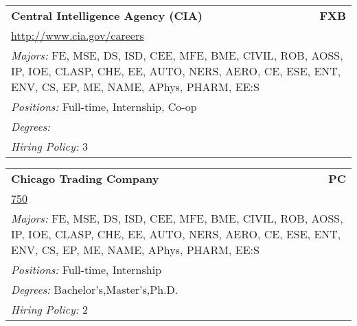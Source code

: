 \documentclass[twoside]{article}
\begin{document}
\begin{center}
\begin{multicols}{3}
\begin{FlushLeft}
\begin{minipage}{\columnwidth}\begin{tabularx}{.95\columnwidth}{Xr}
                 {\Large\bf Central Intelligence Agency (CIA)} & {\Large\bf FXB}\\
    \multicolumn{2}{p{.95\columnwidth}}{\url{http://www.cia.gov/careers}}\\
    \multicolumn{2}{p{.95\columnwidth}}{\emph{Majors:} FE, MSE, DS, ISD, CEE, MFE, BME, CIVIL, ROB, AOSS, IP, IOE, CLASP, CHE, EE, AUTO, NERS, AERO, CE, ESE, ENT, ENV, CS, EP, ME, NAME, APhys, PHARM, EE:S}\\
    \multicolumn{2}{p{.95\columnwidth}}{\emph{Positions:} Full-time, Internship, Co-op}\\
    \multicolumn{2}{p{.95\columnwidth}}{\emph{Degrees:} }\\
    \multicolumn{2}{p{.95\columnwidth}}{\emph{Hiring Policy:} 3}\\
    \end{tabularx}
    
\end{minipage}
 
\begin{minipage}{\columnwidth}\begin{tabularx}{.95\columnwidth}{Xr}
                 {\Large\bf Chicago Trading Company} & {\Large\bf PC}\\
    \multicolumn{2}{p{.95\columnwidth}}{\url{750}}\\
    \multicolumn{2}{p{.95\columnwidth}}{\emph{Majors:} FE, MSE, DS, ISD, CEE, MFE, BME, CIVIL, ROB, AOSS, IP, IOE, CLASP, CHE, EE, AUTO, NERS, AERO, CE, ESE, ENT, ENV, CS, EP, ME, NAME, APhys, PHARM, EE:S}\\
    \multicolumn{2}{p{.95\columnwidth}}{\emph{Positions:} Full-time, Internship}\\
    \multicolumn{2}{p{.95\columnwidth}}{\emph{Degrees:} Bachelor's,Master's,Ph.D.}\\
    \multicolumn{2}{p{.95\columnwidth}}{\emph{Hiring Policy:} 2}\\
    \end{tabularx}
    
\end{minipage}
 

\end{FlushLeft}
\end{multicols}
\end{center}
\end{document}

